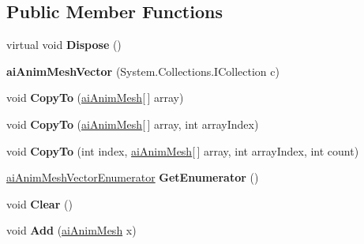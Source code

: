 \subsection*{Public Member Functions}
\begin{DoxyCompactItemize}
\item 
\hypertarget{classai_anim_mesh_vector_a524978d600d9c852e3dba0b3328b5a0d}{virtual void {\bfseries Dispose} ()}\label{classai_anim_mesh_vector_a524978d600d9c852e3dba0b3328b5a0d}

\item 
\hypertarget{classai_anim_mesh_vector_a70e15530f926aef566608e67459126c6}{{\bfseries ai\+Anim\+Mesh\+Vector} (System.\+Collections.\+I\+Collection c)}\label{classai_anim_mesh_vector_a70e15530f926aef566608e67459126c6}

\item 
\hypertarget{classai_anim_mesh_vector_af211abbe0ce3cd3ffbf620e6f8816cb8}{void {\bfseries Copy\+To} (\hyperlink{structai_anim_mesh}{ai\+Anim\+Mesh}\mbox{[}$\,$\mbox{]} array)}\label{classai_anim_mesh_vector_af211abbe0ce3cd3ffbf620e6f8816cb8}

\item 
\hypertarget{classai_anim_mesh_vector_ab7688ba934c9bee951189652807337fa}{void {\bfseries Copy\+To} (\hyperlink{structai_anim_mesh}{ai\+Anim\+Mesh}\mbox{[}$\,$\mbox{]} array, int array\+Index)}\label{classai_anim_mesh_vector_ab7688ba934c9bee951189652807337fa}

\item 
\hypertarget{classai_anim_mesh_vector_ac7d1c02e30aeec033dbed53daea331a7}{void {\bfseries Copy\+To} (int index, \hyperlink{structai_anim_mesh}{ai\+Anim\+Mesh}\mbox{[}$\,$\mbox{]} array, int array\+Index, int count)}\label{classai_anim_mesh_vector_ac7d1c02e30aeec033dbed53daea331a7}

\item 
\hypertarget{classai_anim_mesh_vector_a2e167abd5581f94829775655053ceefc}{\hyperlink{classai_anim_mesh_vector_1_1ai_anim_mesh_vector_enumerator}{ai\+Anim\+Mesh\+Vector\+Enumerator} {\bfseries Get\+Enumerator} ()}\label{classai_anim_mesh_vector_a2e167abd5581f94829775655053ceefc}

\item 
\hypertarget{classai_anim_mesh_vector_a675c4d6c72cea58ff017ef3ee9a44169}{void {\bfseries Clear} ()}\label{classai_anim_mesh_vector_a675c4d6c72cea58ff017ef3ee9a44169}

\item 
\hypertarget{classai_anim_mesh_vector_a9a0d9527af80099150365d372f3faa0b}{void {\bfseries Add} (\hyperlink{structai_anim_mesh}{ai\+Anim\+Mesh} x)}\label{classai_anim_mesh_vector_a9a0d9527af80099150365d372f3faa0b}


\end{DoxyCompactItemize}
